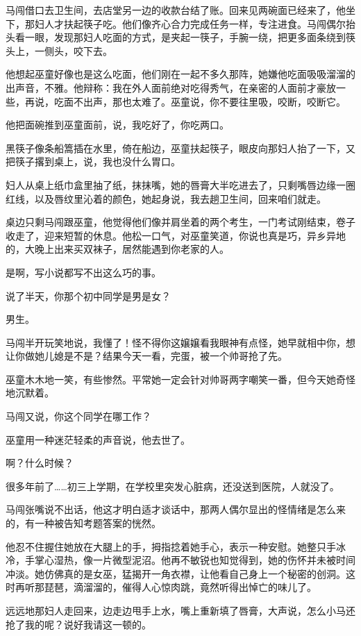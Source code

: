 \documentclass[lang=cn,newtx,12pt,scheme=chinese]{elegantbook}
\begin{document}
马闯借口去卫生间，去店堂另一边的收款台结了账。回来见两碗面已经来了，他坐下，那妇人才扶起筷子吃。他们像齐心合力完成任务一样，专注进食。马闯偶尔抬头看一眼，发现那妇人吃面的方式，是夹起一筷子，手腕一绕，把更多面条绕到筷头上，一侧头，咬下去。

他想起巫童好像也是这么吃面，他们刚在一起不多久那阵，她嫌他吃面吸吸溜溜的出声音，不雅。他辩称：我在外人面前绝对吃得秀气，在亲密的人面前才豪放一些，再说，吃面不出声，那也太难了。巫童说，你不要往里吸，咬断，咬断它。

他把面碗推到巫童面前，说，我吃好了，你吃两口。

黑筷子像条船篙插在水里，倚在船边，巫童扶起筷子，眼皮向那妇人抬了一下，又把筷子撂到桌上，说，我也没什么胃口。

妇人从桌上纸巾盒里抽了纸，抹抹嘴，她的唇膏大半吃进去了，只剩嘴唇边缘一圈红线，以及唇纹里沁着的颜色，她起身说，我去趟卫生间，回来咱们就走。

桌边只剩马闯跟巫童，他觉得他们像并肩坐着的两个考生，一门考试刚结束，卷子收走了，迎来短暂的休息。他松一口气，对巫童笑道，你说也真是巧，异乡异地的，大晚上出来买双袜子，居然能遇到你老家的人。

是啊，写小说都写不出这么巧的事。

说了半天，你那个初中同学是男是女？

男生。

马闯半开玩笑地说，我懂了！怪不得你这嬢嬢看我眼神有点怪，她早就相中你，想让你做她儿媳是不是？结果今天一看，完蛋，被一个帅哥抢了先。

巫童木木地一笑，有些惨然。平常她一定会针对帅哥两字嘲笑一番，但今天她奇怪地沉默着。

马闯又说，你这个同学在哪工作？

巫童用一种迷茫轻柔的声音说，他去世了。

啊？什么时候？

很多年前了……初三上学期，在学校里突发心脏病，还没送到医院，人就没了。

马闯张嘴说不出话，他这才明白适才谈话中，那两人偶尔显出的怪情绪是怎么来的，有一种被告知考题答案的恍然。

他忍不住握住她放在大腿上的手，拇指捻着她手心，表示一种安慰。她整只手冰冷，手掌心湿热，像一片微型泥沼。他再不敏锐也知觉得到，她的伤怀并未被时间冲淡。她仿佛真的是女巫，猛揭开一角衣襟，让他看自己身上一个秘密的创洞。这时再听那琵琶，滴溜溜的，催得人心惊肉跳，竟然听得出悼亡的味儿了。

远远地那妇人走回来，边走边甩手上水，嘴上重新填了唇膏，大声说，怎么小马还抢了我的呢？说好我请这一顿的。
\end{document}
